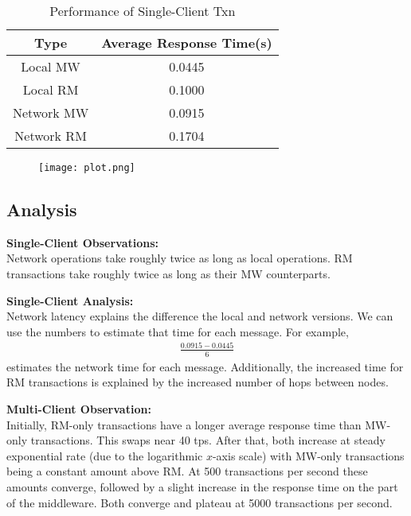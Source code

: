 \documentclass[11pt]{article}
\begin{document}
\begin{table}[H]
\centering
\caption{Performance of Single-Client Txn}
\begin{tabular}{c|c}
Type & Average Response Time(s) \\
\hline
Local MW & 0.0445 \\
Local RM & 0.1000 \\
Network MW & 0.0915 \\
Network RM & 0.1704 \\
\end{tabular}
\end{table}

\begin{figure}[H]
\centering
\texttt{[image: plot.png]}
\end{figure}

\subsection*{Analysis}

\textbf{Single-Client Observations:} \\
Network operations take roughly twice as long as local operations. RM transactions take roughly twice as long as their MW counterparts.\par

\textbf{Single-Client Analysis:} \\
Network latency explains the difference the local and network versions. We can use the numbers to estimate that time for each message. For example, 
\begin{align*}
\frac{0.0915 - 0.0445}{6}
\end{align*}
estimates the network time for each message. Additionally, the increased time for RM transactions is explained by the increased number of hops between nodes. \par

\textbf{Multi-Client Observation:}\\
Initially, RM-only transactions have a longer average response time than MW-only transactions. This swaps near 40 tps. After that, both increase at steady exponential rate (due to the logarithmic $x$-axis scale) with MW-only transactions being a constant amount above RM. At 500 transactions per second these amounts converge, followed by a slight increase in the response time on the part of the middleware. Both converge and plateau at 5000 transactions per second. \par
\end{document}
